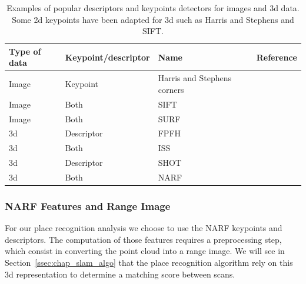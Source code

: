 \begin{table}[H]
    \centering
    \begin{tabular}{@{}llll@{}}
        \toprule
        \textbf{Type of data}  & \textbf{Keypoint/descriptor} & \textbf{Name}               & \textbf{Reference} \\
        \hline
        Image                  & Keypoint                     & Harris and Stephens corners & \cite{Harris1988}  \\
        Image                  & Both                         & SIFT                        & \cite{Lowe2004}    \\
        Image                  & Both                         & SURF                        & \cite{Bay2006}     \\
        \gls*{3d}              & Descriptor                   & FPFH                        & \cite{Rusu2009}    \\
        \gls*{3d}              & Both                         & ISS                         & \cite{Yu2009}      \\
        \gls*{3d}              & Descriptor                   & SHOT                        & \cite{Tombari2010} \\
        \gls*{3d}              & Both                         & NARF                        & \cite{Steder2011a} \\
        \bottomrule
    \end{tabular}
    \caption{ Examples of popular descriptors and keypoints detectors for images and \gls*{3d} data. Some \gls*{2d} keypoints have been adapted for \gls*{3d} such as Harris and Stephens and SIFT.}
    \label{tab:chap_slam_features_examples}
\end{table}

\subsubsection{NARF Features and Range Image}
\label{ssub:NARF Features and Range Image}

For our place recognition analysis we choose to use the NARF keypoints and descriptors. The computation of those features requires a preprocessing step, which consist in converting the point cloud into a range image. We will see in Section~\ref{ssec:chap_slam_algo} that the place recognition algorithm rely on this \gls*{3d} representation to determine a matching score between scans.

